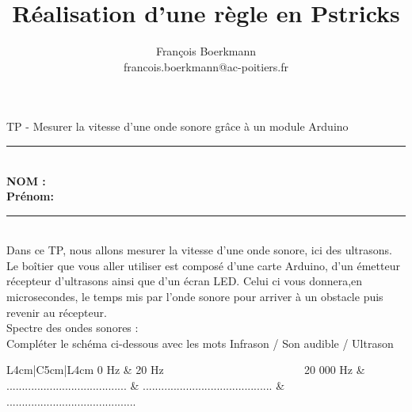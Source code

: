 \documentclass[11pt,a4paper]{article}
\author{Fran\c cois Boerkmann \\francois.boerkmann@ac-poitiers.fr}
\title{R\'ealisation d'une r\`egle en Pstricks}
\begin{document}
\center \LARGE{TP - Mesurer la vitesse d'une onde sonore grâce à un module Arduino}
\\[0,3cm]

\normalsize

\hrule\
\\[0,2cm]

\flushleft \textbf{NOM :\\
Prénom:\\[0,2cm]
}
\hrule\
\\[0,2cm]

Dans ce TP, nous allons mesurer la vitesse d'une onde sonore, ici des ultrasons. Le boîtier que vous aller utiliser est composé d'une carte Arduino, d'un émetteur récepteur d'ultrasons ainsi que d'un écran LED. Celui ci vous donnera,en microsecondes, le temps mis par l'onde sonore pour arriver à un obstacle puis revenir au récepteur. \\[4mm] 


 Spectre des ondes sonores : \\[4mm]
Compléter le schéma ci-dessous avec les mots Infrason / Son audible / Ultrason


\begin{center}
\begin{tabular}{L{4cm}|C{5cm}|L{4cm}}
0 Hz & 20 Hz ~~~~~~~~~~~~~~~~~~~~~~~~ 20 000 Hz & \\
\hline  .......................................  & ..........................................  & ..........................................  \\
\end{tabular}
\end{center}

\vfill 
\end{document}
